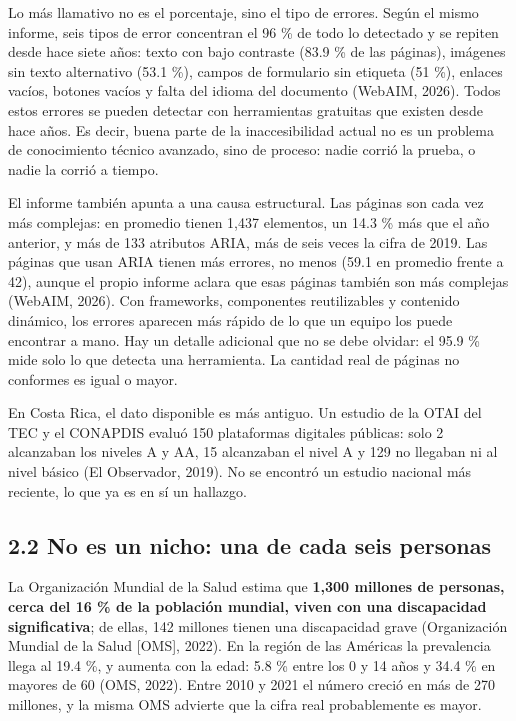 \documentclass[10pt,letterpaper,onecolumn]{IEEEtran}
\begin{document}
Lo más llamativo no es el porcentaje, sino el tipo de errores. Según el mismo informe, seis tipos de error concentran el 96 \% de todo lo detectado y se repiten desde hace siete años: texto con bajo contraste (83.9 \% de las páginas), imágenes sin texto alternativo (53.1 \%), campos de formulario sin etiqueta (51 \%), enlaces vacíos, botones vacíos y falta del idioma del documento (WebAIM, 2026). Todos estos errores se pueden detectar con herramientas gratuitas que existen desde hace años. Es decir, buena parte de la inaccesibilidad actual no es un problema de conocimiento técnico avanzado, sino de proceso: nadie corrió la prueba, o nadie la corrió a tiempo.

El informe también apunta a una causa estructural. Las páginas son cada vez más complejas: en promedio tienen 1,437 elementos, un 14.3 \% más que el año anterior, y más de 133 atributos ARIA, más de seis veces la cifra de 2019. Las páginas que usan ARIA tienen más errores, no menos (59.1 en promedio frente a 42), aunque el propio informe aclara que esas páginas también son más complejas (WebAIM, 2026). Con frameworks, componentes reutilizables y contenido dinámico, los errores aparecen más rápido de lo que un equipo los puede encontrar a mano. Hay un detalle adicional que no se debe olvidar: el 95.9 \% mide solo lo que detecta una herramienta. La cantidad real de páginas no conformes es igual o mayor.

En Costa Rica, el dato disponible es más antiguo. Un estudio de la OTAI del TEC y el CONAPDIS evaluó 150 plataformas digitales públicas: solo 2 alcanzaban los niveles A y AA, 15 alcanzaban el nivel A y 129 no llegaban ni al nivel básico (El Observador, 2019). No se encontró un estudio nacional más reciente, lo que ya es en sí un hallazgo.

\subsection{2.2 No es un nicho: una de cada seis personas}\label{no-es-un-nicho-una-de-cada-seis-personas}

La Organización Mundial de la Salud estima que \textbf{1,300 millones de personas, cerca del 16 \% de la población mundial, viven con una discapacidad significativa}; de ellas, 142 millones tienen una discapacidad grave (Organización Mundial de la Salud {[}OMS{]}, 2022). En la región de las Américas la prevalencia llega al 19.4 \%, y aumenta con la edad: 5.8 \% entre los 0 y 14 años y 34.4 \% en mayores de 60 (OMS, 2022). Entre 2010 y 2021 el número creció en más de 270 millones, y la misma OMS advierte que la cifra real probablemente es mayor.
\end{document}
